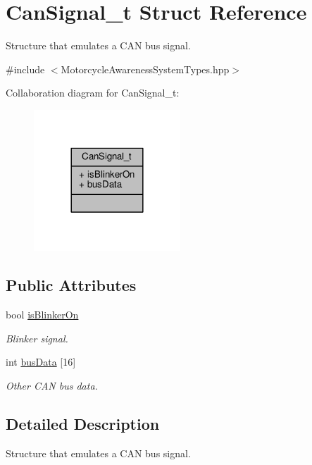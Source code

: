 \hypertarget{structCanSignal__t}{\section{Can\-Signal\-\_\-t Struct Reference}
\label{structCanSignal__t}
}


Structure that emulates a C\-A\-N bus signal.  




{\ttfamily \#include $<$Motorcycle\-Awareness\-System\-Types.\-hpp$>$}



Collaboration diagram for Can\-Signal\-\_\-t\-:\nopagebreak
\begin{figure}[H]
\begin{center}
\leavevmode
\includegraphics[width=156pt]{structCanSignal__t__coll__graph}
\end{center}
\end{figure}
\subsection*{Public Attributes}
\begin{DoxyCompactItemize}
\item 
bool \hyperlink{structCanSignal__t_a209edc6387534529f57c2362ec8f2586}{is\-Blinker\-On}
\begin{DoxyCompactList}\small\item\em Blinker signal. \end{DoxyCompactList}\item 
int \hyperlink{structCanSignal__t_a460bece1b65aa03b07f986c71f818456}{bus\-Data} \mbox{[}16\mbox{]}
\begin{DoxyCompactList}\small\item\em Other C\-A\-N bus data. \end{DoxyCompactList}\end{DoxyCompactItemize}


\subsection{Detailed Description}
Structure that emulates a C\-A\-N bus signal. 

